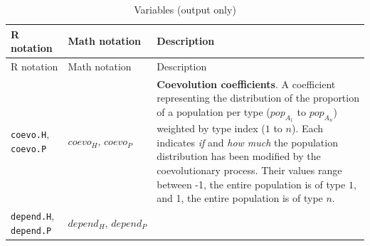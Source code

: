 \documentclass[]{book}
\begin{document}
\begin{longtable}[]{@{}lll@{}}
\caption{Variables (output only)}\tabularnewline
\toprule
\begin{minipage}[b]{0.36\columnwidth}\raggedright
R notation\strut
\end{minipage} & \begin{minipage}[b]{0.21\columnwidth}\raggedright
Math notation\strut
\end{minipage} & \begin{minipage}[b]{0.34\columnwidth}\raggedright
Description\strut
\end{minipage}\tabularnewline
\midrule
\endfirsthead
\toprule
\begin{minipage}[b]{0.36\columnwidth}\raggedright
R notation\strut
\end{minipage} & \begin{minipage}[b]{0.21\columnwidth}\raggedright
Math notation\strut
\end{minipage} & \begin{minipage}[b]{0.34\columnwidth}\raggedright
Description\strut
\end{minipage}\tabularnewline
\midrule
\endhead
\begin{minipage}[t]{0.36\columnwidth}\raggedright
\texttt{coevo.H}, \texttt{coevo.P}\strut
\end{minipage} & \begin{minipage}[t]{0.21\columnwidth}\raggedright
\(coevo_{H},\,coevo_{P}\)\strut
\end{minipage} & \begin{minipage}[t]{0.34\columnwidth}\raggedright
\textbf{Coevolution coefficients}. A coefficient representing the distribution of the proportion of a population per type (\(pop_{A_1}\) to \(pop_{A_n}\)) weighted by type index (\(1\) to \(n\)). Each indicates \emph{if} and \emph{how much} the population distribution has been modified by the coevolutionary process. Their values range between -1, the entire population is of type \(1\), and 1, the entire population is of type \(n\).\strut
\end{minipage}\tabularnewline
\begin{minipage}[t]{0.36\columnwidth}\raggedright
\texttt{depend.H}, \texttt{depend.P}\strut
\end{minipage} & \begin{minipage}[t]{0.21\columnwidth}\raggedright
\(depend_{H},\,depend_{P}\)\strut
\end{minipage} & \begin{minipage}[t]{0.34\columnwidth}\raggedright

\end{minipage}
\end{longtable}
\end{document}
